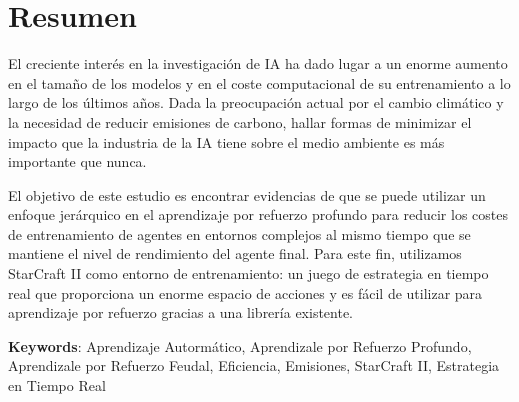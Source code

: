\chapter*{Resumen}

El creciente interés en la investigación de IA ha dado lugar a un enorme aumento en el tamaño de los modelos y en el coste computacional de su entrenamiento a lo largo de los últimos años. Dada la preocupación actual por el cambio climático y la necesidad de reducir emisiones de carbono, hallar formas de minimizar el impacto que la industria de la IA tiene sobre el medio ambiente es más importante que nunca.

El objetivo de este estudio es encontrar evidencias de que se puede utilizar un enfoque jerárquico en el aprendizaje por refuerzo profundo para reducir los costes de entrenamiento de agentes en entornos complejos al mismo tiempo que se mantiene el nivel de rendimiento del agente final. Para este fin, utilizamos StarCraft II como entorno de entrenamiento: un juego de estrategia en tiempo real que proporciona un enorme espacio de acciones y es fácil de utilizar para aprendizaje por refuerzo gracias a una librería existente.

\vspace{1.5cm}

\textbf{Keywords}: Aprendizaje Autormático, Aprendizale por Refuerzo Profundo, Aprendizale por Refuerzo Feudal, Eficiencia, Emisiones, StarCraft II, Estrategia en Tiempo Real